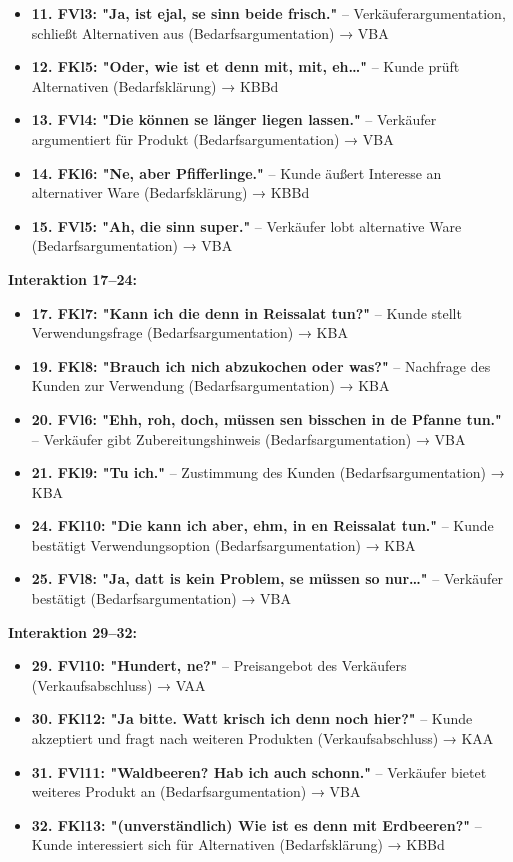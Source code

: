 \documentclass[
]{article}
\begin{document}
\begin{itemize}
\item
  \textbf{11. FVl3: "Ja, ist ejal, se sinn beide frisch."} -- Verkäuferargumentation, schließt Alternativen aus (Bedarfsargumentation) → VBA
\item
  \textbf{12. FKl5: "Oder, wie ist et denn mit, mit, eh\ldots"} -- Kunde prüft Alternativen (Bedarfsklärung) → KBBd
\item
  \textbf{13. FVl4: "Die können se länger liegen lassen."} -- Verkäufer argumentiert für Produkt (Bedarfsargumentation) → VBA
\item
  \textbf{14. FKl6: "Ne, aber Pfifferlinge."} -- Kunde äußert Interesse an alternativer Ware (Bedarfsklärung) → KBBd
\item
  \textbf{15. FVl5: "Ah, die sinn super."} -- Verkäufer lobt alternative Ware (Bedarfsargumentation) → VBA
\end{itemize}

\textbf{Interaktion 17--24:}

\begin{itemize}
\item
  \textbf{17. FKl7: "Kann ich die denn in Reissalat tun?"} -- Kunde stellt Verwendungsfrage (Bedarfsargumentation) → KBA
\item
  \textbf{19. FKl8: "Brauch ich nich abzukochen oder was?"} -- Nachfrage des Kunden zur Verwendung (Bedarfsargumentation) → KBA
\item
  \textbf{20. FVl6: "Ehh, roh, doch, müssen se\textquotesingle n bisschen in de Pfanne tun."} -- Verkäufer gibt Zubereitungshinweis (Bedarfsargumentation) → VBA
\item
  \textbf{21. FKl9: "Tu ich."} -- Zustimmung des Kunden (Bedarfsargumentation) → KBA
\item
  \textbf{24. FKl10: "Die kann ich aber, ehm, in en Reissalat tun."} -- Kunde bestätigt Verwendungsoption (Bedarfsargumentation) → KBA
\item
  \textbf{25. FVl8: "Ja, datt is kein Problem, se müssen so nur\ldots"} -- Verkäufer bestätigt (Bedarfsargumentation) → VBA
\end{itemize}

\textbf{Interaktion 29--32:}

\begin{itemize}
\item
  \textbf{29. FVl10: "Hundert, ne?"} -- Preisangebot des Verkäufers (Verkaufsabschluss) → VAA
\item
  \textbf{30. FKl12: "Ja bitte. Watt krisch ich denn noch hier?"} -- Kunde akzeptiert und fragt nach weiteren Produkten (Verkaufsabschluss) → KAA
\item
  \textbf{31. FVl11: "Waldbeeren? Hab ich auch schonn."} -- Verkäufer bietet weiteres Produkt an (Bedarfsargumentation) → VBA
\item
  \textbf{32. FKl13: "(unverständlich) Wie ist es denn mit Erdbeeren?"} -- Kunde interessiert sich für Alternativen (Bedarfsklärung) → KBBd
\end{itemize}
\end{document}
